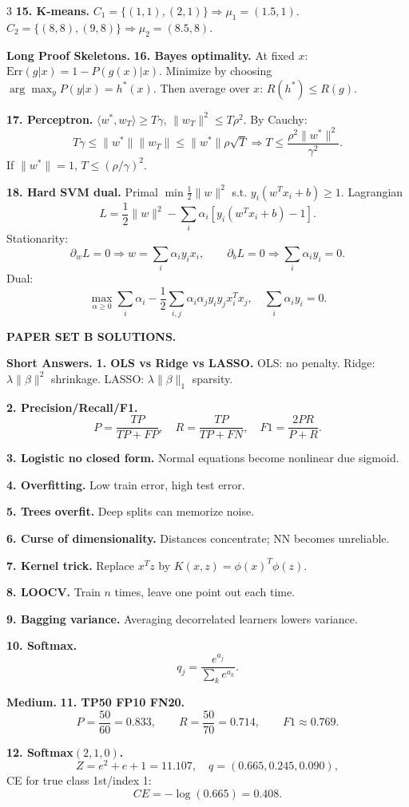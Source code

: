 \documentclass[8pt,fleqn]{extarticle}
\begin{document}
\begin{multicols}{3}
\textbf{15. K-means.} $C_1=\{(1,1),(2,1)\}\Rightarrow \mu_1=(1.5,1)$. $C_2=\{(8,8),(9,8)\}\Rightarrow \mu_2=(8.5,8)$.

\textbf{Long Proof Skeletons.}
\textbf{16. Bayes optimality.} At fixed $x$: $\mathrm{Err}(g|x)=1-P(g(x)|x)$. Minimize by choosing $\arg\max_y P(y|x)=h^*(x)$. Then average over $x$: $R(h^*)\le R(g)$.

\textbf{17. Perceptron.} $\langle w^*,w_T\rangle\ge T\gamma$, $\|w_T\|^2\le T\rho^2$. By Cauchy:
\[
T\gamma\le \|w^*\|\|w_T\|\le \|w^*\|\rho\sqrt T
\Rightarrow T\le \frac{\rho^2\|w^*\|^2}{\gamma^2}.
\]
If $\|w^*\|=1$, $T\le(\rho/\gamma)^2$.

\textbf{18. Hard SVM dual.} Primal $\min \frac12\|w\|^2$ s.t. $y_i(w^Tx_i+b)\ge1$. Lagrangian
\[
L=\frac12\|w\|^2-\sum_i\alpha_i[y_i(w^Tx_i+b)-1].
\]
Stationarity:
\[
\partial_wL=0\Rightarrow w=\sum_i\alpha_i y_i x_i,\qquad
\partial_bL=0\Rightarrow \sum_i\alpha_i y_i=0.
\]
Dual:
\[
\max_{\alpha\ge0}\sum_i\alpha_i-\frac12\sum_{i,j}\alpha_i\alpha_j y_iy_j x_i^Tx_j,
\quad \sum_i\alpha_i y_i=0.
\]

\textbf{PAPER SET B SOLUTIONS.}

\textbf{Short Answers.}
\textbf{1. OLS vs Ridge vs LASSO.} OLS: no penalty. Ridge: $\lambda\|\beta\|^2$ shrinkage. LASSO: $\lambda\|\beta\|_1$ sparsity.

\textbf{2. Precision/Recall/F1.}
\[
P=\frac{TP}{TP+FP},\quad R=\frac{TP}{TP+FN},\quad F1=\frac{2PR}{P+R}.
\]

\textbf{3. Logistic no closed form.} Normal equations become nonlinear due sigmoid.

\textbf{4. Overfitting.} Low train error, high test error.

\textbf{5. Trees overfit.} Deep splits can memorize noise.

\textbf{6. Curse of dimensionality.} Distances concentrate; NN becomes unreliable.

\textbf{7. Kernel trick.} Replace $x^Tz$ by $K(x,z)=\phi(x)^T\phi(z)$.

\textbf{8. LOOCV.} Train $n$ times, leave one point out each time.

\textbf{9. Bagging variance.} Averaging decorrelated learners lowers variance.

\textbf{10. Softmax.}
\[
q_j=\frac{e^{a_j}}{\sum_k e^{a_k}}.
\]

\textbf{Medium.}
\textbf{11. TP50 FP10 FN20.}
\[
P=\frac{50}{60}=0.833,\qquad R=\frac{50}{70}=0.714,\qquad
F1\approx0.769.
\]

\textbf{12. Softmax$(2,1,0)$.}
\[
Z=e^2+e+1=11.107,\quad q=(0.665,0.245,0.090),
\]
CE for true class 1st/index 1:
\[
CE=-\log(0.665)=0.408.
\]


\end{multicols}
\end{document}
